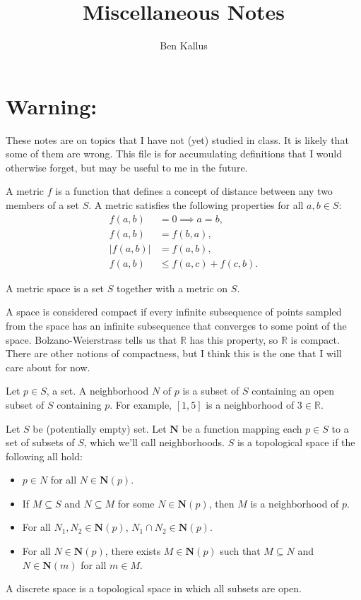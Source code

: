 \documentclass[12pt]{article}
\title{Miscellaneous Notes}
\author{Ben Kallus}
\begin{document}
\maketitle

\section*{Warning:} These notes are on topics that I have not (yet) studied in class. It is likely that some of them are wrong. This file is for accumulating definitions that I would otherwise forget, but may be useful to me in the future.

\bigskip
{}

    A metric $f$ is a function that defines a concept of distance between any two members of a set $S$. A metric satisfies the following properties for all $a, b \in S$:
    \begin{align*}
        f(a, b) &= 0 \implies a = b, \\
        f(a, b) &= f(b, a), \\
        |f(a, b)| &= f(a, b), \\
        f(a, b) &\leq f(a, c) + f(c, b).
    \end{align*}

\medskip
{}

    A metric space is a set $S$ together with a metric on $S$.

\medskip
{}

    A space is considered compact if every infinite subsequence of points sampled from the space has an infinite subsequence that converges to some point of the space. Bolzano-Weierstrass tells us that $\mathbb R$ has this property, so $\mathbb R$ is compact. There are other notions of compactness, but I think this is the one that I will care about for now.

\medskip
{}

    Let $p \in S$, a set. A neighborhood $N$ of $p$ is a subset of $S$ containing an open subset of $S$ containing $p$. For example, $[1,5]$ is a neighborhood of $3 \in \mathbb R$.

\newpage
{}

    Let $S$ be (potentially empty) set. Let $\mathbf N$ be a function mapping each $p \in S$ to a set of subsets of $S$, which we'll call neighborhoods. $S$ is a topological space if the following all hold:
    \begin{itemize}
        \item $p \in N$ for all $N \in \mathbf N(p)$.
        \item If $M \subseteq S$ and $N \subseteq M$ for some $N \in \mathbf N(p)$, then $M$ is a neighborhood of $p$.
        \item For all $N_1, N_2 \in \mathbf N(p)$, $N_1 \cap N_2 \in \mathbf N(p)$.
        \item For all $N \in \mathbf N(p)$, there exists $M \in \mathbf N(p)$ such that $M \subseteq N$ and $N \in \mathbf N(m)$ for all $m \in M$.
    \end{itemize}

\medskip
{}

    A discrete space is a topological space in which all subsets are open.
\end{document}

